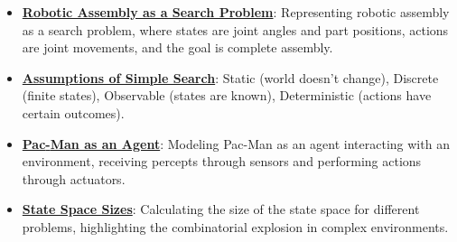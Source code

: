 \documentclass{article}%
\begin{document}
\begin{itemize}[leftmargin=*]
\item \href{https://purdue.brightspace.com/d2l/common/assets/pdfjs-d2l-dist/1.0.14-legacy/web/viewer.html?file=\%2Fcontent\%2Fenforced\%2F1095467-wl.202510.CS.24300.001\%2F14L1-DepthFS.pdf\%3Fou\%3D1095467\&lang=en-us\&container=d2l-fileviewer-rendered-pdf\&fullscreen=d2l-fileviewer-rendered-pdf-dialog\&height=667#page=33}{\textbf{Robotic Assembly as a Search Problem}}: Representing robotic assembly as a search problem, where states are joint angles and part positions, actions are joint movements, and the goal is complete assembly.%
\item \href{https://purdue.brightspace.com/d2l/common/assets/pdfjs-d2l-dist/1.0.14-legacy/web/viewer.html?file=\%2Fcontent\%2Fenforced\%2F1095467-wl.202510.CS.24300.001\%2F14L1-DepthFS.pdf\%3Fou\%3D1095467\&lang=en-us\&container=d2l-fileviewer-rendered-pdf\&fullscreen=d2l-fileviewer-rendered-pdf-dialog\&height=667#page=34}{\textbf{Assumptions of Simple Search}}: Static (world doesn't change), Discrete (finite states), Observable (states are known), Deterministic (actions have certain outcomes).%
\item \href{https://purdue.brightspace.com/d2l/common/assets/pdfjs-d2l-dist/1.0.14-legacy/web/viewer.html?file=\%2Fcontent\%2Fenforced\%2F1095467-wl.202510.CS.24300.001\%2F14L1-DepthFS.pdf\%3Fou\%3D1095467\&lang=en-us\&container=d2l-fileviewer-rendered-pdf\&fullscreen=d2l-fileviewer-rendered-pdf-dialog\&height=667#page=35}{\textbf{Pac{-}Man as an Agent}}: Modeling Pac-Man as an agent interacting with an environment, receiving percepts through sensors and performing actions through actuators.%
\item \href{https://purdue.brightspace.com/d2l/common/assets/pdfjs-d2l-dist/1.0.14-legacy/web/viewer.html?file=\%2Fcontent\%2Fenforced\%2F1095467-wl.202510.CS.24300.001\%2F14L1-DepthFS.pdf\%3Fou\%3D1095467\&lang=en-us\&container=d2l-fileviewer-rendered-pdf\&fullscreen=d2l-fileviewer-rendered-pdf-dialog\&height=667#page=38}{\textbf{State Space Sizes}}: Calculating the size of the state space for different problems, highlighting the combinatorial explosion in complex environments.%
\end{itemize}%
\end{document}

